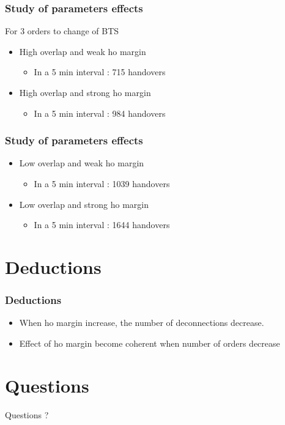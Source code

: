 \documentclass{beamer}
\begin{document}
\begin{frame}
\frametitle{Study of parameters effects}
For 3 orders to change of BTS
\begin{itemize}
 \item High overlap and weak ho margin
  \begin{itemize}
    \item In a 5 min interval : 715 handovers
  \end{itemize}
 \item High overlap and strong ho margin
  \begin{itemize}
    \item In a 5 min interval : 984 handovers
  \end{itemize}
\end{itemize}
\end{frame}
\begin{frame}
\frametitle{Study of parameters effects}
\begin{itemize}
  \item Low overlap and weak ho margin
  \begin{itemize}
    \item In a 5 min interval : 1039 handovers
  \end{itemize}
  \item Low overlap and strong ho margin
  \begin{itemize}
    \item In a 5 min interval : 1644 handovers
  \end{itemize}
\end{itemize}
\end{frame}
\section{Deductions}
\begin{frame}
\frametitle{Deductions}
\begin{itemize}
  \item When ho margin increase, the number of deconnections decrease.
  \item Effect of ho margin become coherent when number of orders decrease
\end{itemize}
\end{frame}

\section*{Questions}

\begin{frame}
\begin{center}
Questions ?
\end{center}
\end{frame}
\end{document}
